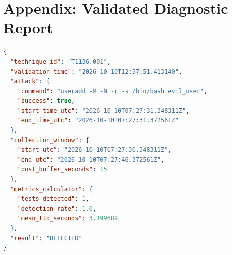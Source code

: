 \documentclass[11pt,a4paper]{article}
\begin{document}
\section*{Appendix: Validated Diagnostic Report}

\begin{lstlisting}[language=json,caption={validation\_20261010\_125751.json}]
{
  "technique_id": "T1136.001",
  "validation_time": "2026-10-10T12:57:51.413140",
  "attack": {
    "command": "useradd -M -N -r -s /bin/bash evil_user",
    "success": true,
    "start_time_utc": "2026-10-10T07:27:31.348311Z",
    "end_time_utc": "2026-10-10T07:27:31.372561Z"
  },
  "collection_window": {
    "start_utc": "2026-10-10T07:27:30.348311Z",
    "end_utc": "2026-10-10T07:27:46.372561Z",
    "post_buffer_seconds": 15
  },
  "metrics_calculator": {
    "tests_detected": 1,
    "detection_rate": 1.0,
    "mean_ttd_seconds": 3.199689
  },
  "result": "DETECTED"
}
\end{lstlisting}
\end{document}
